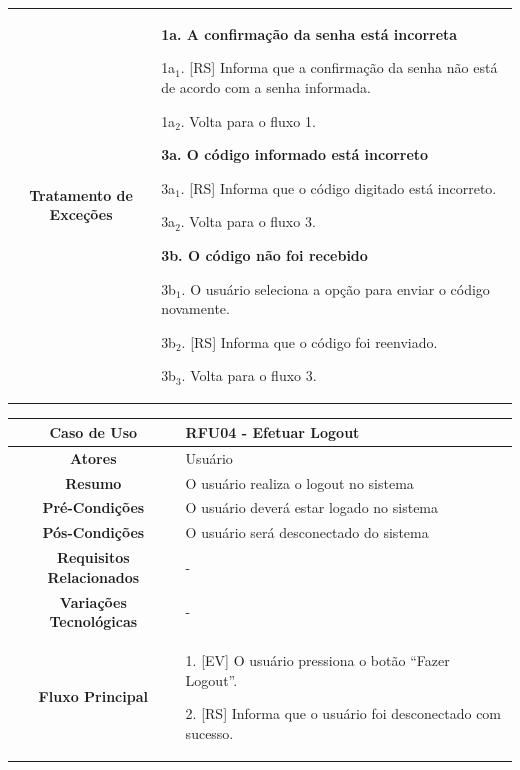 \begin{apendicesenv}
\begin{quadro}[htb]
\begin{tabular}{|c|p{11cm}|}
		\textbf{Tratamento de Exceções} &
		\parbox[t]{11cm}{
			\raggedright
			\textbf{1a. A confirmação da senha está incorreta}\par
			1a$_1$. [RS] Informa que a confirmação da senha não está de acordo com a senha informada.\par
			1a$_2$. Volta para o fluxo 1.\par
			
			\textbf{3a. O código informado está incorreto}\par
			3a$_1$. [RS] Informa que o código digitado está incorreto.\par
			3a$_2$. Volta para o fluxo 3.\par
			
			\textbf{3b. O código não foi recebido}\par
			3b$_1$. O usuário seleciona a opção para enviar o código novamente.\par
			3b$_2$. [RS] Informa que o código foi reenviado.\par
			3b$_3$. Volta para o fluxo 3.
		}
		\\ \hline
	\end{tabular}
	
\end{quadro}

\begin{quadro}[htb]
	\centering
	\caption{\label{quadro_rfu04}Caso de Uso Efetuar Logout (Baixo Nível)}
	\small
	\renewcommand{\arraystretch}{1.1}
	
	\begin{tabular}{|c|p{11cm}|}
		\hline
		\textbf{Caso de Uso} & RFU04 - Efetuar Logout \\ \hline
		\textbf{Atores} & Usuário \\ \hline
		\textbf{Resumo} & O usuário realiza o logout no sistema \\ \hline
		\textbf{Pré-Condições} & O usuário deverá estar logado no sistema \\ \hline
		\textbf{Pós-Condições} & O usuário será desconectado do sistema \\ \hline
		\textbf{Requisitos Relacionados} & - \\ \hline
		\textbf{Variações Tecnológicas} & - \\ \hline
		
		\textbf{Fluxo Principal} &
		\parbox[t]{11cm}{
			\raggedright
			1. [EV] O usuário pressiona o botão ``Fazer Logout''.\par
			2. [RS] Informa que o usuário foi desconectado com sucesso.
		}
		\\ \hline
		

\end{tabular}
\end{quadro}
\end{apendicesenv}
